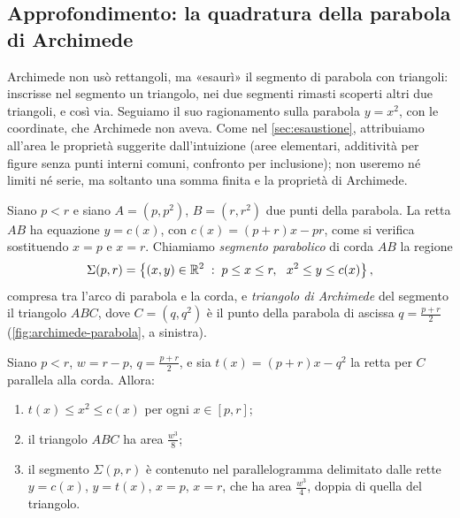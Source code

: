 \subsection{Approfondimento: la quadratura della parabola di Archimede}
\label{subsec:archimede-parabola}

Archimede non usò rettangoli, ma «esaurì» il segmento di parabola con triangoli:
inscrisse nel segmento un triangolo, nei due segmenti rimasti scoperti altri due
triangoli, e così via. Seguiamo il suo ragionamento sulla parabola $y=x^{2}$, con le
coordinate, che Archimede non aveva. Come nel \cref{sec:esaustione}, attribuiamo
all'area le proprietà suggerite dall'intuizione (aree elementari, additività per figure
senza punti interni comuni, confronto per inclusione); non useremo né limiti né serie,
ma soltanto una somma finita e la proprietà di Archimede.

Siano $p<r$ e siano $A=(p,p^{2})$, $B=(r,r^{2})$ due punti della parabola. La retta
$AB$ ha equazione $y=c(x)$, con $c(x)=(p+r)x-pr$, come si verifica sostituendo $x=p$ e
$x=r$. Chiamiamo \emph{segmento parabolico} di corda $AB$ la regione
\begin{equation}\label{eq:segmento-parabolico}
  \Sigma(p,r)=\left\{ (x,y)\in\mathbb{R}^{2} \;:\; p\le x\le r,\ \ x^{2}\le y\le c(x) \right\} ,
\end{equation}
compresa tra l'arco di parabola e la corda, e \emph{triangolo di Archimede} del segmento
il triangolo $ABC$, dove $C=(q,q^{2})$ è il punto della parabola di ascissa
$q=\frac{p+r}2$ (\cref{fig:archimede-parabola}, a sinistra).

\begin{lemma}\label{lem:triangolo-archimede}
Siano $p<r$, $w=r-p$, $q=\frac{p+r}2$, e sia $t(x)=(p+r)x-q^{2}$ la retta per $C$
parallela alla corda. Allora:
\begin{enumerate}[label=\textup{(\alph*)}]
  \item $t(x)\le x^{2}\le c(x)$ per ogni $x\in[p,r]$;
  \item il triangolo $ABC$ ha area $\frac{w^{3}}8$;
  \item il segmento $\Sigma(p,r)$ è contenuto nel parallelogramma delimitato dalle rette
  $y=c(x)$, $y=t(x)$, $x=p$, $x=r$, che ha area $\frac{w^{3}}4$, doppia di quella del
  triangolo.
\end{enumerate}
\end{lemma}

\begin{schema}
\end{schema}

